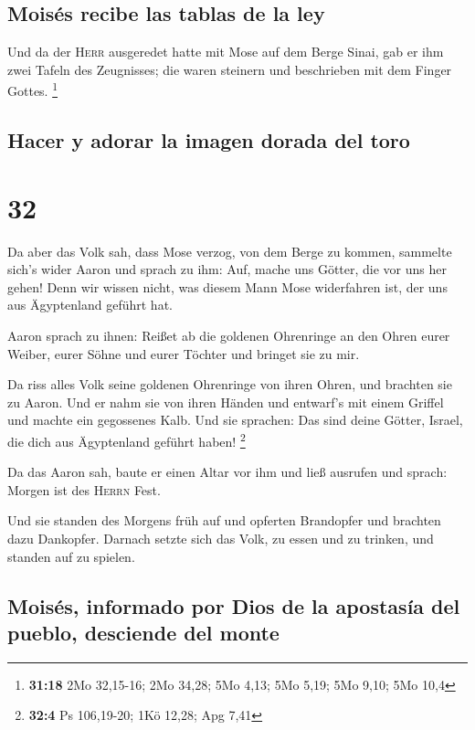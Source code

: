 \hypertarget{moisuxe9s-recibe-las-tablas-de-la-ley}{%
\subsection{Moisés recibe las tablas de la
ley}\label{moisuxe9s-recibe-las-tablas-de-la-ley}}

 Und da der \textsc{Herr} ausgeredet hatte mit Mose auf
dem Berge Sinai, gab er ihm zwei Tafeln des Zeugnisses; die waren
steinern und beschrieben mit dem Finger Gottes. \footnote{\textbf{31:18}
  2Mo 32,15-16; 2Mo 34,28; 5Mo 4,13; 5Mo 5,19; 5Mo 9,10; 5Mo 10,4}

\hypertarget{hacer-y-adorar-la-imagen-dorada-del-toro}{%
\subsection{Hacer y adorar la imagen dorada del
toro}\label{hacer-y-adorar-la-imagen-dorada-del-toro}}

\hypertarget{section-31}{%
\section{32}\label{section-31}}

 Da aber das Volk sah, dass Mose verzog, von dem Berge zu
kommen, sammelte sich's wider Aaron und sprach zu ihm: Auf, mache uns
Götter, die vor uns her gehen! Denn wir wissen nicht, was diesem Mann
Mose widerfahren ist, der uns aus Ägyptenland geführt hat.

 Aaron sprach zu ihnen: Reißet ab die goldenen Ohrenringe
an den Ohren eurer Weiber, eurer Söhne und eurer Töchter und bringet sie
zu mir.

 Da riss alles Volk seine goldenen Ohrenringe von ihren
Ohren, und brachten sie zu Aaron.  Und er nahm sie von
ihren Händen und entwarf's mit einem Griffel und machte ein gegossenes
Kalb. Und sie sprachen: Das sind deine Götter, Israel, die dich aus
Ägyptenland geführt haben! \footnote{\textbf{32:4} Ps 106,19-20; 1Kö
  12,28; Apg 7,41}

 Da das Aaron sah, baute er einen Altar vor ihm und ließ
ausrufen und sprach: Morgen ist des \textsc{Herrn} Fest.

 Und sie standen des Morgens früh auf und opferten
Brandopfer und brachten dazu Dankopfer. Darnach setzte sich das Volk, zu
essen und zu trinken, und standen auf zu spielen.

\hypertarget{moisuxe9s-informado-por-dios-de-la-apostasuxeda-del-pueblo-desciende-del-monte}{%
\subsection{Moisés, informado por Dios de la apostasía del pueblo,
desciende del
monte}\label{moisuxe9s-informado-por-dios-de-la-apostasuxeda-del-pueblo-desciende-del-monte}}


